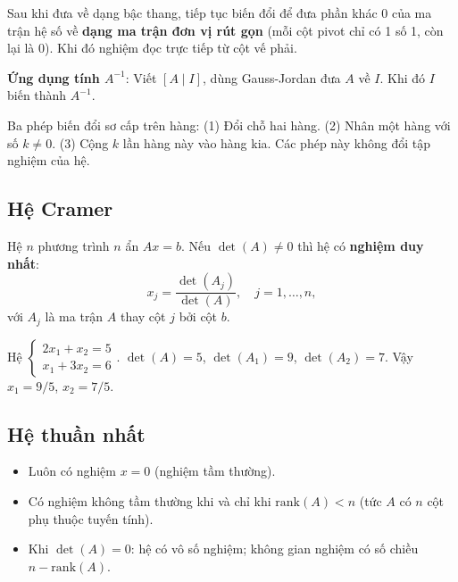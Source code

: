 \documentclass[12pt,a4paper]{article}
\begin{document}
\begin{phuongphap}[title={Phương pháp Gauss-Jordan}]
  Sau khi đưa về dạng bậc thang, tiếp tục biến đổi để đưa phần khác 0 của ma trận hệ số về \textbf{dạng ma trận đơn vị rút gọn} (mỗi cột pivot chỉ có 1 số 1, còn lại là 0). Khi đó nghiệm đọc trực tiếp từ cột vế phải.
  
  \textbf{Ứng dụng tính $A^{-1}$}: Viết $[A \mid I]$, dùng Gauss-Jordan đưa $A$ về $I$. Khi đó $I$ biến thành $A^{-1}$.
\end{phuongphap}

\begin{luuy}
  Ba phép biến đổi sơ cấp trên hàng: (1) Đổi chỗ hai hàng. (2) Nhân một hàng với số $k \ne 0$. (3) Cộng $k$ lần hàng này vào hàng kia. Các phép này không đổi tập nghiệm của hệ.
\end{luuy}

\subsection{Hệ Cramer}

\begin{dinhly}[title={Công thức Cramer}]
  Hệ $n$ phương trình $n$ ẩn $Ax = b$. Nếu $\det(A) \ne 0$ thì hệ có \textbf{nghiệm duy nhất}:
  \[
    x_j = \frac{\det(A_j)}{\det(A)}, \quad j = 1, \ldots, n,
  \]
  với $A_j$ là ma trận $A$ thay cột $j$ bởi cột $b$.
\end{dinhly}

\begin{vidu}
  Hệ $\begin{cases} 2x_1 + x_2 = 5 \\ x_1 + 3x_2 = 6 \end{cases}$. $\det(A) = 5$, $\det(A_1) = 9$, $\det(A_2) = 7$. Vậy $x_1 = 9/5$, $x_2 = 7/5$.
\end{vidu}

\subsection{Hệ thuần nhất}

\begin{dinhly}[title={Hệ thuần nhất $Ax = 0$}]
  \begin{itemize}
    \item Luôn có nghiệm $x = 0$ (nghiệm tầm thường).
    \item Có nghiệm không tầm thường khi và chỉ khi $\mathrm{rank}(A) < n$ (tức $A$ có $n$ cột phụ thuộc tuyến tính).
    \item Khi $\det(A) = 0$: hệ có vô số nghiệm; không gian nghiệm có số chiều $n - \mathrm{rank}(A)$.
  \end{itemize}
\end{dinhly}
\end{document}
